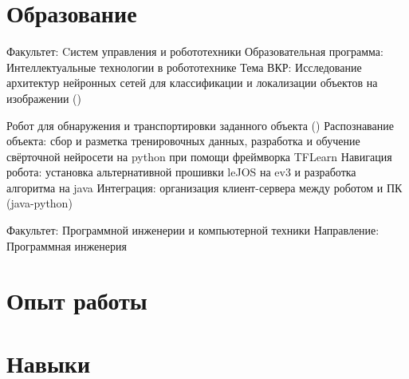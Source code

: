 \documentclass[12pt,a4paper,russian]{moderncv}
\begin{document}
\makecvtitle

\section{Образование}
{\newline Факультет: Cистем управления и робототехники 
\newline Образовательная программа: Интеллектуальные технологии в робототехнике
\newline Тема ВКР: Исследование архитектур нейронных сетей для классификации и локализации объектов на изображении ()}
{}{}

 

{Робот для обнаружения и транспортировки заданного объекта ()}{}
{\newline Распознавание объекта: сбор и разметка тренировочных данных, разработка и обучение свёрточной нейросети на python при помощи фреймворка TFLearn
\newline Навигация робота: установка альтернативной прошивки leJOS на ev3 и разработка алгоритма на java
\newline Интеграция: организация клиент-сервера между роботом и ПК (java-python)}
{}
{}

{\newline Факультет: Программной инженерии и компьютерной техники \newline Направление: Программная инженерия}{}{}

\section{Опыт работы}

\section{Навыки}
\end{document}
